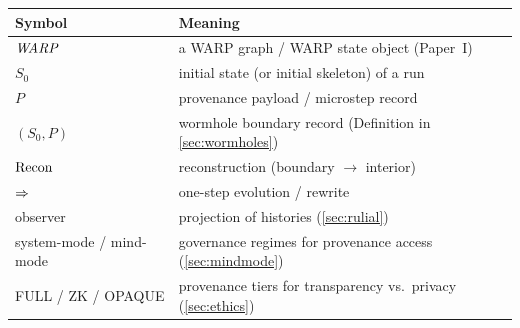 \documentclass{aion}
\begin{document}
\begin{center}
\begin{tabular}{ll}
  Symbol & Meaning \\ \hline
  $\WARP$ & a WARP graph / WARP state object (Paper~I) \\
  $S_0$ & initial state (or initial skeleton) of a run \\
  $P$ & provenance payload / microstep record \\
  $(S_0,P)$ & wormhole boundary record (Definition in \cref{sec:wormholes}) \\
  $\operatorname{Recon}$ & reconstruction (boundary $\to$ interior) \\
  $\Rightarrow$ & one-step evolution / rewrite \\
  observer & projection of histories (\cref{sec:rulial}) \\
  system-mode / mind-mode & governance regimes for provenance access (\cref{sec:mindmode}) \\
  FULL / ZK / OPAQUE & provenance tiers for transparency vs.\ privacy (\cref{sec:ethics}) \\
\end{tabular}
\end{center}

\clearpage
{}


\end{document}
